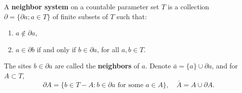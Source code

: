 A \textbf{neighbor system} on a countable parameter set $T$ is a collection $\partial = \{\partial a; a \in T\}$ of finite subsets of $T$ such that:
\begin{enumerate}
\item[(i)] $a \notin \partial a$,
\item[(ii)] $a \in \partial b$ if and only if $b \in \partial a$, for all $a, b \in T$.
\end{enumerate}
The sites $b \in \partial a$ are called the \textbf{neighbors} of $a$. Denote $\bar{a} = \{a\} \cup \partial a$, and for $A \subset T$,
$$\partial A = \{b \in T - A : b \in \partial a \text{ for some } a \in A\}, \quad \bar{A} = A \cup \partial A.$$

